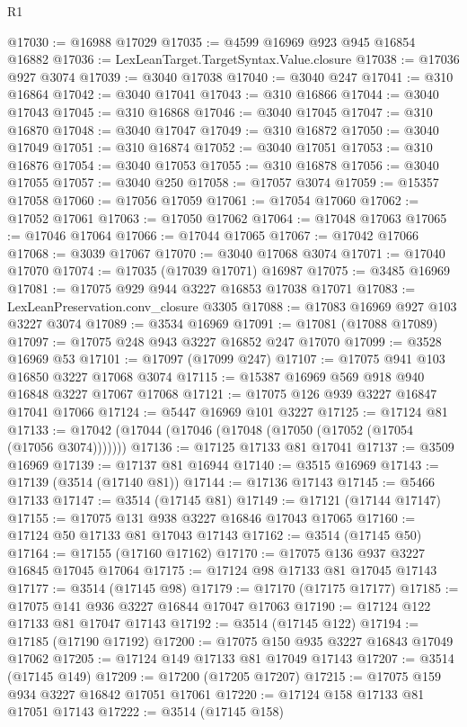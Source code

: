 \begin{lexlean}{R1}
\begin{coremodule}
@17030 := @16988 @17029
@17035 := @4599 @16969 @923 @945 @16854 @16882
@17036 := LexLeanTarget.TargetSyntax.Value.closure
@17038 := @17036 @927 @3074
@17039 := @3040 @17038
@17040 := @3040 @247
@17041 := @310 @16864
@17042 := @3040 @17041
@17043 := @310 @16866
@17044 := @3040 @17043
@17045 := @310 @16868
@17046 := @3040 @17045
@17047 := @310 @16870
@17048 := @3040 @17047
@17049 := @310 @16872
@17050 := @3040 @17049
@17051 := @310 @16874
@17052 := @3040 @17051
@17053 := @310 @16876
@17054 := @3040 @17053
@17055 := @310 @16878
@17056 := @3040 @17055
@17057 := @3040 @250
@17058 := @17057 @3074
@17059 := @15357 @17058
@17060 := @17056 @17059
@17061 := @17054 @17060
@17062 := @17052 @17061
@17063 := @17050 @17062
@17064 := @17048 @17063
@17065 := @17046 @17064
@17066 := @17044 @17065
@17067 := @17042 @17066
@17068 := @3039 @17067
@17070 := @3040 @17068 @3074
@17071 := @17040 @17070
@17074 := @17035 (@17039 @17071) @16987
@17075 := @3485 @16969
@17081 := @17075 @929 @944 @3227 @16853 @17038 @17071
@17083 := LexLeanPreservation.conv_closure @3305
@17088 := @17083 @16969 @927 @103 @3227 @3074
@17089 := @3534 @16969
@17091 := @17081 (@17088 @17089)
@17097 := @17075 @248 @943 @3227 @16852 @247 @17070
@17099 := @3528 @16969 @53
@17101 := @17097 (@17099 @247)
@17107 := @17075 @941 @103 @16850 @3227 @17068 @3074
@17115 := @15387 @16969 @569 @918 @940 @16848 @3227 @17067 @17068
@17121 := @17075 @126 @939 @3227 @16847 @17041 @17066
@17124 := @5447 @16969 @101 @3227
@17125 := @17124 @81
@17133 := @17042 (@17044 (@17046 (@17048 (@17050 (@17052 (@17054 (@17056 @3074)))))))
@17136 := @17125 @17133 @81 @17041
@17137 := @3509 @16969
@17139 := @17137 @81 @16944
@17140 := @3515 @16969
@17143 := @17139 (@3514 (@17140 @81))
@17144 := @17136 @17143
@17145 := @5466 @17133
@17147 := @3514 (@17145 @81)
@17149 := @17121 (@17144 @17147)
@17155 := @17075 @131 @938 @3227 @16846 @17043 @17065
@17160 := @17124 @50 @17133 @81 @17043 @17143
@17162 := @3514 (@17145 @50)
@17164 := @17155 (@17160 @17162)
@17170 := @17075 @136 @937 @3227 @16845 @17045 @17064
@17175 := @17124 @98 @17133 @81 @17045 @17143
@17177 := @3514 (@17145 @98)
@17179 := @17170 (@17175 @17177)
@17185 := @17075 @141 @936 @3227 @16844 @17047 @17063
@17190 := @17124 @122 @17133 @81 @17047 @17143
@17192 := @3514 (@17145 @122)
@17194 := @17185 (@17190 @17192)
@17200 := @17075 @150 @935 @3227 @16843 @17049 @17062
@17205 := @17124 @149 @17133 @81 @17049 @17143
@17207 := @3514 (@17145 @149)
@17209 := @17200 (@17205 @17207)
@17215 := @17075 @159 @934 @3227 @16842 @17051 @17061
@17220 := @17124 @158 @17133 @81 @17051 @17143
@17222 := @3514 (@17145 @158)

\end{coremodule}
\end{lexlean}
